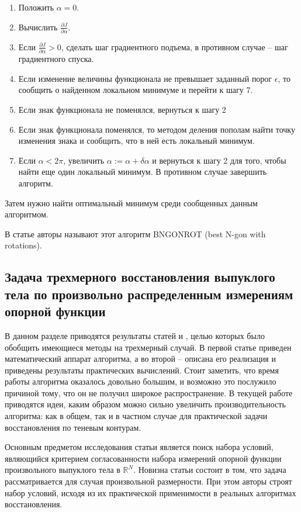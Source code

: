 \documentclass[a4paper, 12pt, titlepage]{article}
\theoremstyle{definition}
\theoremstyle{plain}
\theoremstyle{plain}
\begin{document}
\begin{enumerate}
 \item Положить $\alpha = 0$.
 \item Вычислить $\frac{\partial J}{\partial \alpha}$.
 \item Если $\frac{\partial J}{\partial \alpha} > 0$, сделать шаг градиентного
подъема, в противном случае -- шаг градиентного спуска.
 \item Если изменение величины функционала не превышает заданный порог
$\epsilon$, то сообщить о найденном локальном минимуме и перейти к шагу 7.
 \item Если знак функционала не поменялся, вернуться к шагу 2
 \item Если знак функционала поменялся, то методом деления пополам найти точку
изменения знака и сообщить, что в ней есть локальный минимум.
 \item Если $\alpha < 2 \pi$, увеличить $\alpha := \alpha + \delta \alpha$ и
вернуться к шагу 2 для того, чтобы найти еще один локальный минимум. В противном
случае завершить алгоритм.
\end{enumerate}

Затем нужно найти оптимальный минимум среди сообщенных данным алгоритмом.

В статье авторы называют этот алгоритм BNGONROT (best N-gon with rotations).

\newpage
\subsection{Задача трехмерного восстановления выпуклого тела по произвольно
распределенным измерениям опорной функции}
\label{sec:support-methods:3d-nonuniform}

В данном разделе приводятся результаты статей \cite{journals/jmiv/KarlKVW96} и
\cite{conf/spie/GregorR2001}, целью которых было обобщить имеющиеся методы на
трехмерный случай. В первой статье приведен математический аппарат алгоритма,
а во второй -- описана его реализация и приведены результаты практических
вычислений. Стоит заметить, что время работы алгоритма оказалось довольно
большим, и возможно это послужило причиной тому, что он не получил широкое
распространение. В текущей работе приводятся идеи, каким образом можно сильно
увеличить производительность алгоритма: как в общем, так и в частном случае
для практической задачи восстановления по теневым контурам.

Основным предметом исследования статьи \cite{journals/jmiv/KarlKVW96} является
поиск набора условий, являющийся критерием согласованности набора измерений
опорной функции произвольного выпуклого тела в $\mathbb{R}^{N}$. Новизна статьи
состоит в том, что задача рассматривается для случая произвольной размерности.
При этом авторы строят набор условий, исходя из их практической применимости в
реальных алгоритмах восстановления.
\end{document}

